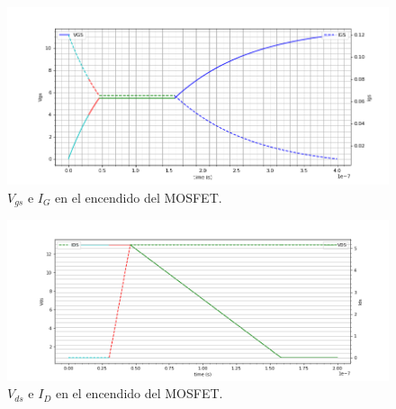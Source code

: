 \begin{figure}[H]
	\centering
	\includegraphics[width=0.8\linewidth]{ImagenesEjercicio-1/encendido_gate}
	\caption{$V_{gs}$ e $I_G$ en el encendido del MOSFET.}
	\label{ej1:fig:encendido_gate}
\end{figure}

\begin{figure}[H]
	\centering
	\includegraphics[width=0.8\linewidth]{ImagenesEjercicio-1/encendido_drain}
	\caption{$V_{ds}$ e $I_D$ en el encendido del MOSFET.}
	\label{ej1:fig:encendido_drain}
\end{figure}

